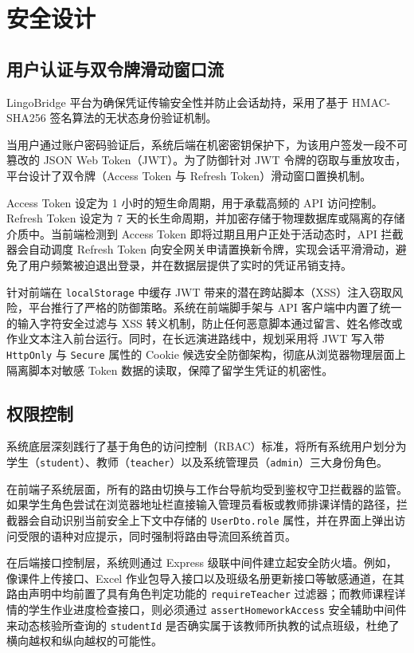 \chapter{安全设计}

\section{用户认证与双令牌滑动窗口流}
LingoBridge 平台为确保凭证传输安全性并防止会话劫持，采用了基于 HMAC-SHA256 签名算法的无状态身份验证机制。

当用户通过账户密码验证后，系统后端在机密密钥保护下，为该用户签发一段不可篡改的 JSON Web Token（JWT）。为了防御针对 JWT 令牌的窃取与重放攻击，平台设计了双令牌（Access Token 与 Refresh Token）滑动窗口置换机制。

Access Token 设定为 1 小时的短生命周期，用于承载高频的 API 访问控制。Refresh Token 设定为 7 天的长生命周期，并加密存储于物理数据库或隔离的存储介质中。当前端检测到 Access Token 即将过期且用户正处于活动态时，API 拦截器会自动调度 Refresh Token 向安全网关申请置换新令牌，实现会话平滑滑动，避免了用户频繁被迫退出登录，并在数据层提供了实时的凭证吊销支持。

针对前端在 \texttt{localStorage} 中缓存 JWT 带来的潜在跨站脚本（XSS）注入窃取风险，平台推行了严格的防御策略。系统在前端脚手架与 API 客户端中内置了统一的输入字符安全过滤与 XSS 转义机制，防止任何恶意脚本通过留言、姓名修改或作业文本注入前台运行。同时，在长远演进路线中，规划采用将 JWT 写入带 \texttt{HttpOnly} 与 \texttt{Secure} 属性的 Cookie 候选安全防御架构，彻底从浏览器物理层面上隔离脚本对敏感 Token 数据的读取，保障了留学生凭证的机密性。

\section{权限控制}
系统底层深刻践行了基于角色的访问控制（RBAC）标准，将所有系统用户划分为学生（\texttt{student}）、教师（\texttt{teacher}）以及系统管理员（\texttt{admin}）三大身份角色。

在前端子系统层面，所有的路由切换与工作台导航均受到鉴权守卫拦截器的监管。如果学生角色尝试在浏览器地址栏直接输入管理员看板或教师排课详情的路径，拦截器会自动识别当前安全上下文中存储的 \texttt{UserDto.role} 属性，并在界面上弹出访问受限的语种对应提示，同时强制将路由导流回系统首页。

在后端接口控制层，系统则通过 Express 级联中间件建立起安全防火墙。例如，像课件上传接口、Excel 作业包导入接口以及班级名册更新接口等敏感通道，在其路由声明中均前置了具有角色判定功能的 \texttt{requireTeacher} 过滤器；而教师课程详情的学生作业进度检查接口，则必须通过 \texttt{assertHomeworkAccess} 安全辅助中间件来动态核验所查询的 \texttt{studentId} 是否确实属于该教师所执教的试点班级，杜绝了横向越权和纵向越权的可能性。

